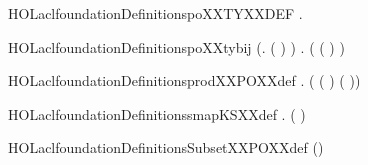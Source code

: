 \begin{SaveVerbatim}{HOLaclfoundationDefinitionspoXXTYXXDEF}
\HOLTokenTurnstile{} \HOLSymConst{\HOLTokenExists{}}.   
\end{SaveVerbatim}
\newcommand{\HOLaclfoundationDefinitionspoXXTYXXDEF}{\UseVerbatim{HOLaclfoundationDefinitionspoXXTYXXDEF}}
\begin{SaveVerbatim}{HOLaclfoundationDefinitionspoXXtybij}
\HOLTokenTurnstile{} (\HOLSymConst{\HOLTokenForall{}}.  ( ) \HOLSymConst{=} ) \HOLSymConst{\HOLTokenConj{}}
   \HOLSymConst{\HOLTokenForall{}}.   \HOLSymConst{\HOLTokenEquiv{}} ( ( ) \HOLSymConst{=} )
\end{SaveVerbatim}
\newcommand{\HOLaclfoundationDefinitionspoXXtybij}{\UseVerbatim{HOLaclfoundationDefinitionspoXXtybij}}
\begin{SaveVerbatim}{HOLaclfoundationDefinitionsprodXXPOXXdef}
\HOLTokenTurnstile{} \HOLSymConst{\HOLTokenForall{}} .
        \HOLSymConst{=}  ( ( ) ( ))
\end{SaveVerbatim}
\newcommand{\HOLaclfoundationDefinitionsprodXXPOXXdef}{\UseVerbatim{HOLaclfoundationDefinitionsprodXXPOXXdef}}
\begin{SaveVerbatim}{HOLaclfoundationDefinitionssmapKSXXdef}
\HOLTokenTurnstile{} \HOLSymConst{\HOLTokenForall{}}   .
      (    ) \HOLSymConst{=} 
\end{SaveVerbatim}
\newcommand{\HOLaclfoundationDefinitionssmapKSXXdef}{\UseVerbatim{HOLaclfoundationDefinitionssmapKSXXdef}}
\begin{SaveVerbatim}{HOLaclfoundationDefinitionsSubsetXXPOXXdef}
\HOLTokenTurnstile{}  \HOLSymConst{=}  (\HOLConst{\HOLTokenSubset{}})
\end{SaveVerbatim}
\newcommand{\HOLaclfoundationDefinitionsSubsetXXPOXXdef}{\UseVerbatim{HOLaclfoundationDefinitionsSubsetXXPOXXdef}}
